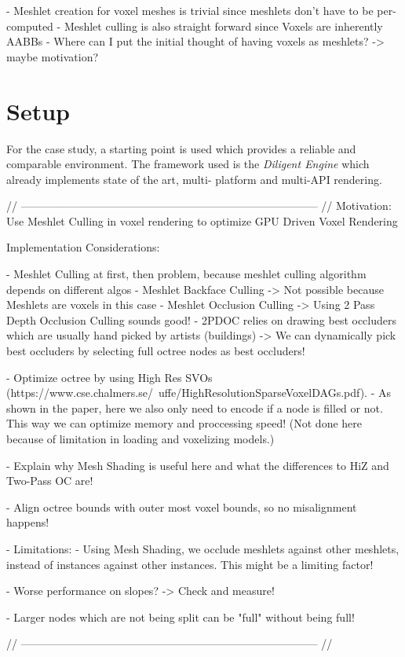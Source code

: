 
- Meshlet creation for voxel meshes is trivial since meshlets don't have to be per-computed
- Meshlet culling is also straight forward since Voxels are inherently AABBs
- Where can I put the initial thought of having voxels as meshlets? -> maybe motivation? 

\section{Setup}

For the case study, a starting point is used which provides a reliable and comparable environment.
The framework used is the \emph{Diligent Engine} which already implements state of the art, multi-
platform and multi-API rendering. \\

\noindent



// --------------------------------------------------------------------------------- //
Motivation:
Use Meshlet Culling in voxel rendering to optimize GPU Driven Voxel Rendering


Implementation Considerations:

- Meshlet Culling at first, then problem, because meshlet culling algorithm depends on different algos
    - Meshlet Backface Culling -> Not possible because Meshlets are voxels in this case
    - Meshlet Occlusion Culling -> Using 2 Pass Depth Occlusion Culling sounds good!
    - 2PDOC relies on drawing best occluders which are usually hand picked by artists (buildings)
        -> We can dynamically pick best occluders by selecting full octree nodes as best occluders!

- Optimize octree by using High Res SVOs (https://www.cse.chalmers.se/~uffe/HighResolutionSparseVoxelDAGs.pdf).
    - As shown in the paper, here we also only need to encode if a node is filled or not. This way we can 
    optimize memory and proccessing speed! (Not done here because of limitation in loading and voxelizing models.)

- Explain why Mesh Shading is useful here and what the differences to HiZ and Two-Pass OC are!

- Align octree bounds with outer most voxel bounds, so no misalignment happens!
    
- Limitations: 
    - Using Mesh Shading, we occlude meshlets against other meshlets, instead of instances against other
    instances. This might be a limiting factor!

- Worse performance on slopes? -> Check and measure!

- Larger nodes which are not being split can be "full" without being full!

// --------------------------------------------------------------------------------- //
